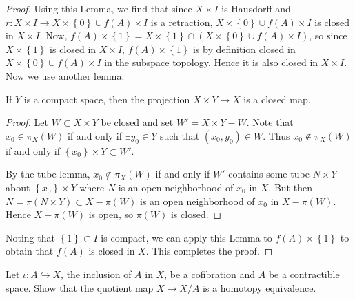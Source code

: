 \begin{proof}
    Using this Lemma, we find that since
    $X \times I$ is Hausdorff and
    $r \colon X \times I \to X \times \left\{ 0 \right\} 
    \cup f(A) \times I$ is a retraction,
    $X \times \left\{ 0 \right\} \cup 
    f(A) \times I$ is closed in
    $X \times I$.
    Now,
    $f(A) \times \left\{ 1 \right\} 
    = X \times \left\{ 1 \right\} 
    \cap \left( X \times \left\{ 0 \right\} \cup 
    f(A) \times I\right) $, so
    since $X \times \left\{ 1 \right\} $ is closed
    in $X \times I$,
    $f(A) \times \left\{ 1 \right\} $ 
    is by definition closed in 
    $X \times \left\{ 0 \right\} \cup 
    f(A) \times I$ in the subspace topology. Hence
    it is also closed in $X \times I$.
    Now we use another lemma:
    \begin{lemma}[]
        If $Y$ is a compact space, then
        the projection $X \times Y \to X$ is a closed map.
    \end{lemma}
    \begin{proof}
        Let $W \subset X \times Y$ be closed and
        set $W' = X \times Y -W$.
        Note that $x_0 \in \pi_X (W)$ if and only
        if $\exists y_0 \in Y$ such that
        $(x_0,y_0) \in W$. Thus
        $x_0 \not\in \pi_X(W)$ if and only if
        $\left\{ x_0 \right\} \times Y \subset 
        W'$.

        By the tube lemma,
        $x_0 \not\in \pi_X (W)$ if and only if
        $W'$ contains some tube
        $N \times Y$ about $\left\{ x_0 \right\} \times Y$ 
        where $N$ is an open neighborhood of $x_0$ in $X$. 
        But then
        $N = \pi(N \times Y) \subset 
        X - \pi(W)$ is an open neighborhood of $x_0$ in
        $X - \pi(W)$. Hence
        $X - \pi(W)$ is open, so $\pi(W)$ is
        closed.
    \end{proof}
    Noting that
    $\left\{ 1 \right\} \subset I$ is compact,
    we can apply this Lemma to
    $f(A) \times \left\{ 1 \right\} $ to obtain that
    $f(A)$ is closed in $X$.
    This completes the proof.

\end{proof}

\newpage
\begin{problem}[]
    Let $\iota \colon A \hookrightarrow X$,
    the inclusion of $A$ in $X$, be a cofibration and
    $A$ be a contractible space. Show that the
    quotient map $X \to X / A$ is a homotopy equivalence.
\end{problem}

